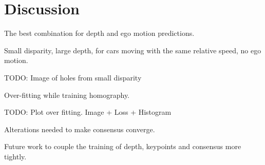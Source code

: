 \chapter{Discussion}\label{cha:discussion}

The best combination for depth and ego motion predictions.

Small disparity, large depth, for cars moving with the same relative speed, no ego motion.

TODO: Image of holes from small disparity

Over-fitting while training homography.

TODO: Plot over fitting. Image + Loss + Histogram

Alterations needed to make consensus converge.

Future work to couple the training of depth, keypoints and consensus more tightly.